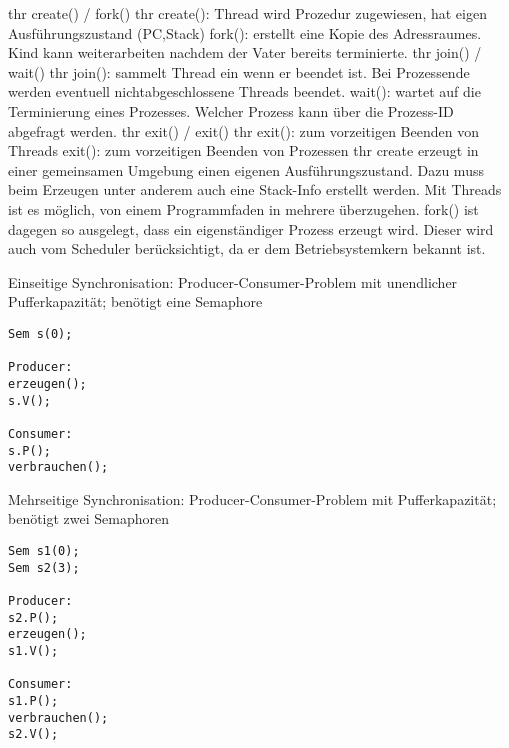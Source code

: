 \begin{answer}
thr create() / fork()
thr create():
Thread wird Prozedur zugewiesen, hat eigen Ausführungszustand (PC,Stack)
fork():
erstellt eine Kopie des Adressraumes. Kind kann weiterarbeiten nachdem der Vater bereits terminierte.
thr join() / wait()
thr join():
sammelt Thread ein wenn er beendet ist. Bei Prozessende werden eventuell nichtabgeschlossene
Threads beendet.
wait():
wartet auf die Terminierung eines Prozesses. Welcher Prozess kann über die Prozess-ID abgefragt
werden.
thr exit() / exit()
thr exit():
zum vorzeitigen Beenden von Threads
exit():
zum vorzeitigen Beenden von Prozessen
thr create erzeugt in einer gemeinsamen Umgebung einen eigenen Ausführungszustand. Dazu muss
beim Erzeugen unter anderem auch eine Stack-Info erstellt werden. Mit Threads ist es möglich,
von einem Programmfaden in mehrere überzugehen. fork() ist dagegen so ausgelegt, dass ein
eigenständiger Prozess erzeugt wird. Dieser wird auch vom Scheduler berücksichtigt, da er dem
Betriebsystemkern bekannt ist.
\end{answer}

\begin{answer}
Einseitige Synchronisation: Producer-Consumer-Problem mit unendlicher Pufferkapazität; benötigt eine Semaphore
\begin{verbatim}
Sem s(0);

Producer:
erzeugen();
s.V();

Consumer:
s.P();
verbrauchen();
\end{verbatim}

Mehrseitige Synchronisation: Producer-Consumer-Problem mit Pufferkapazität; benötigt zwei Semaphoren
\label{mehrseitige-synchronisation-beispiel}

\begin{verbatim}
Sem s1(0);
Sem s2(3);

Producer:
s2.P();
erzeugen();
s1.V();

Consumer:
s1.P();
verbrauchen();
s2.V();
\end{verbatim}
\end{answer}

